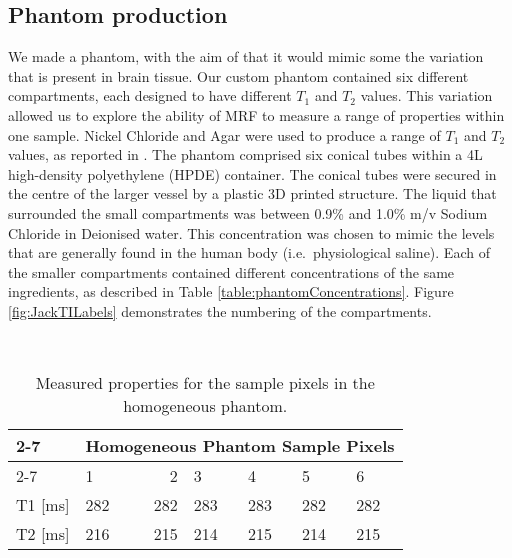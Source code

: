 \documentclass[journal]{IEEEtran}
\begin{document}
\subsection{Phantom production}
We made a phantom, with the aim of that it would mimic some the variation that is present in brain tissue.
Our custom phantom contained six different compartments, each designed to have different $T_1$ and $T_2$ values.
This variation allowed us to explore the ability of MRF to measure a range of properties within one sample. 
Nickel Chloride and Agar were used to produce a range of $T_1$ and $T_2$ values, as reported in \cite{cochlin2003dependence}. The phantom comprised six conical tubes within a 4L high-density polyethylene (HPDE) container. The conical tubes were secured in the centre of the larger vessel by a plastic 3D printed structure. The liquid that surrounded the small compartments was between 0.9\% and 1.0\% m/v Sodium Chloride in Deionised water. This concentration was chosen to mimic the levels that are generally found in the human body (i.e.\ physiological saline).  Each of the smaller compartments contained different concentrations of the same ingredients, as described in Table \ref{table:phantomConcentrations}.
Figure \ref{fig:JackTILabels} demonstrates the numbering of the compartments.

\begin{table}[]
\centering
\
\begin{tabular}{|l|l|r|l|l|l|l|}
\cline{2-7}
\multicolumn{1}{c|} {\multirow{2}{*}{}} & \multicolumn{6}{l|}{\cellcolor[HTML]{EFEFEF} Homogeneous Phantom Sample Pixels} \\ \cline{2-7} 
\multicolumn{1}{c|}{} & 1 & 2 & 3 & 4 & 5 & 6 \\ \hline
T1 [ms]& 282 & 282 & 283 & 283 & 282 & 282 \\ \hline
T2 [ms] &  216& 215 & 214 & 215  & 214 &  215\\ \hline
\end{tabular}
\\\
\caption{Measured properties for the sample pixels in the homogeneous phantom.}
\label{table:homogeneousPhantomMeasurements}
\end{table}
\end{document}
